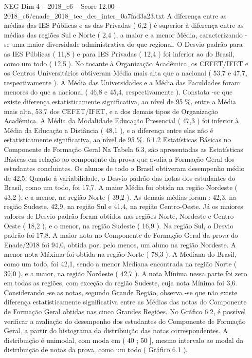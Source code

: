 \begin{textsample}{NEG Dim 4 – 2018\_c6 – Score 12.00 – 2018\_c6/enade\_2018\_tec\_des\_inter\_0a7fad3a23.txt}
A diferença entre as médias das IES Públicas e as das Privadas ( 6,2 ) é superior à diferença entre as médias das regiões Sul e Norte ( 2,4 ), a maior e a menor Média, caracterizando -se uma maior diversidade administrativa do que regional.
O Desvio padrão para as IES Públicas ( 11,8 ) e para IES Privadas ( 12,4 ) foi inferior ao do Brasil, como um todo ( 12,5 ).
No tocante à Organização Acadêmica, os CEFET/IFET e os Centros Universitários obtiveram Média mais alta que a nacional ( 53,7 e 47,7, respectivamente ).
A Média das Universidades e a Média das Faculdades foram menores do que a nacional ( 46,8 e 45,4, respectivamente ).
Constata -se que existe diferença estatisticamente significativa, ao nível de 95 \%, entre a Média mais alta, 53,7 dos CEFET/IFET, e a dos demais tipos de Organização Acadêmica.
A Média da Modalidade Educação Presencial ( 47,3 ) foi inferior à Média da Educação a Distância ( 48,1 ), e a diferença entre elas não é estatisticamente significativa, ao nível de 95 \%. 6.1.2 Estatísticas Básicas no Componente de Formação Geral Na Tabela 6.3, são apresentadas as Estatísticas Básicas em relação ao componente da prova que avalia a Formação Geral dos estudantes concluintes.
Os alunos de todo o Brasil obtiveram desempenho médio de 42,5.
Quanto à variabilidade, o Desvio padrão das notas dos estudantes do Brasil, como um todo, foi 17,7.
A maior Média foi obtida na região Nordeste ( 43,2 ), e a menor, na região Norte ( 39,2 ).
As demais médias foram : 42,3, na região Sudeste, 42,9, na região Sul e 41,4, na região Centro-Oeste.
Já os maiores valores de Desvio padrão foram obtidos nas regiões Norte, Nordeste e Centro-Oeste ( 18,2 ), e o menor, na região Sudeste ( 16,9 ).
Na região Sul, o Desvio padrão foi 17,8.
A maior nota no Componente de Formação Geral da prova do Enade/2018 foi 94,0, obtida por, pelo menos, um aluno na região Nordeste.
A menor nota Máxima foi obtida na região Norte ( 78,3 ).
A Mediana do Brasil, como um todo, foi 42,1, sendo a menor Mediana encontrada na região Norte ( 39,0 ), e a maior, na região Nordeste ( 42,7 ).
A nota Mínima nessa parte foi zero em todas as regiões, com exceção da região Sudeste, cuja nota Mínima foi 3,6.
Considerando -se as notas, segundo Grande Região, observa -se que não existe diferença estatisticamente significativa entre as Médias das notas do Componente de Formação Geral obtidas nas cinco Grandes Regiões.
No Gráfico 6.2, é possível verificar a avaliação do desempenho dos estudantes do Componente de Formação Geral, a partir do histograma da distribuição das notas correspondentes.
A distribuição é unimodal, com moda em ( 40 ; 50 ], mesmo intervalo ao modal da distribuição de notas da prova, como um todo ( Gráfico 6.1 ).

\end{textsample}
